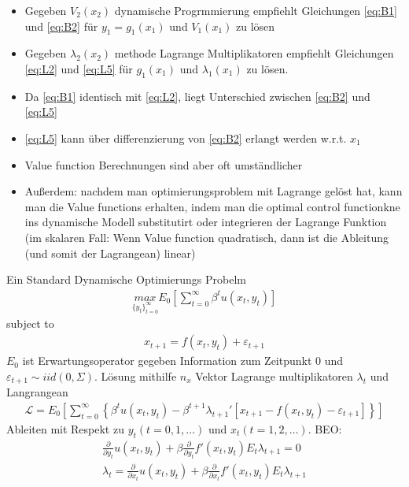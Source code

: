 \documentclass[smaller,compress]{beamer}  %
\begin{document}
\begin{frame}
  \begin{itemize}
    \item Gegeben $V_2(x_2)$ dynamische Progrmmierung empfiehlt Gleichungen \eqref{eq:B1} und \eqref{eq:B2} für $y_1=g_1(x_1)$ und $V_1(x_1)$ zu lösen
    \item Gegeben $\lambda_2(x_2)$ methode Lagrange Multiplikatoren empfiehlt Gleichungen \eqref{eq:L2} und \eqref{eq:L5} für $g_1(x_1)$ und $\lambda_1(x_1)$ zu lösen.
    \item Da \eqref{eq:B1} identisch mit \eqref{eq:L2}, liegt Unterschied zwischen \eqref{eq:B2} und \eqref{eq:L5}
    \item \eqref{eq:L5} kann über differenzierung von \eqref{eq:B2} erlangt werden w.r.t. $x_1$
    \item Value function Berechnungen sind aber oft umständlicher
    \item Außerdem: nachdem man optimierungsproblem mit Lagrange gelöst hat, kann man die Value functions erhalten, indem man die optimal control functionkne ins dynamische Modell substitutirt oder integrieren der Lagrange Funktion (im skalaren Fall: Wenn Value function quadratisch, dann ist die Ableitung (und somit der Lagrangean) linear)
  \end{itemize}
\end{frame}

\begin{frame}
  Ein Standard Dynamische Optimierungs Probelm
  \begin{align}
    \underset{\{y_t\}_{t=0}^\infty}{max} E_0 \left[\sum_{t=0}^\infty\beta^t u(x_t,y_t)\right]
  \end{align}
  subject to
  \begin{align}
    x_{t+1} = f(x_t,y_t) + \varepsilon_{t+1}
  \end{align}
  $E_0$ ist Erwartungsoperator gegeben Information zum Zeitpunkt 0 und $\varepsilon_{t+1} \sim iid(0,\Sigma)$. Lösung mithilfe $n_x$ Vektor Lagrange multiplikatoren $\lambda_t$ und Langrangean
  \begin{align}
    \mathcal{L} = E_0 \left[\sum_{t=0}^\infty \left\{ \beta^t u(x_t,y_t) - \beta^{t+1} \lambda_{t+1}'\left[x_{t+1}-f(x_t,y_t)-\varepsilon_{t+1}\right]\right\}\right] \label{eq:Lagr}
  \end{align}
  Ableiten mit Respekt zu $y_t (t=0,1,\dots)$ und $x_t (t=1,2,\dots)$. BEO:
  \begin{align}
    \frac{\partial}{\partial y_t} u(x_t,y_t) + \beta \frac{\partial}{\partial y_t} f'(x_t,y_t)E_t \lambda_{t+1} = 0\\
    \lambda_t = \frac{\partial}{\partial x_t} u(x_t,y_t) + \beta \frac{\partial}{\partial x_t} f'(x_t,y_t) E_t \lambda_{t+1}
  \end{align}
\end{frame}
\end{document}
